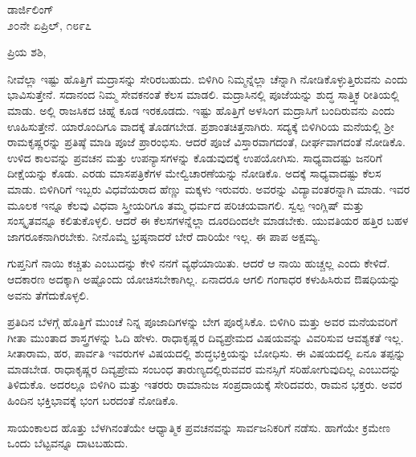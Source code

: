\vspace{-0.5cm}

\begin{flushright}
ಡಾರ್ಜಿಲಿಂಗ್\\೨೦ನೇ ಏಪ್ರಿಲ್, ೧೮೯೭
\end{flushright}

\vspace{-0.3cm}

\noindent
ಪ್ರಿಯ ಶಶಿ,

ನೀವೆಲ್ಲಾ ಇಷ್ಟು ಹೊತ್ತಿಗೆ ಮದ್ರಾಸನ್ನು ಸೇರಿರಬಹುದು. ಬಿಳಿಗಿರಿ ನಿಮ್ಮನ್ನೆಲ್ಲಾ ಚೆನ್ನಾಗಿ ನೋಡಿಕೊಳ್ಳುತ್ತಿರುವನು ಎಂದು ಭಾವಿಸುತ್ತೇನೆ. ಸದಾನಂದ ನಿಮ್ಮ ಸೇವಕನಂತೆ ಕೆಲಸ ಮಾಡಲಿ. ಮದ್ರಾಸಿನಲ್ಲಿ ಪೂಜೆಯನ್ನು ಶುದ್ಧ ಸಾತ್ತ್ವಿಕ ರೀತಿಯಲ್ಲಿ ಮಾಡು. ಅಲ್ಲಿ ರಾಜಸಿಕದ ಚಿಹ್ನೆ ಕೂಡ ಇರಕೂಡದು. ಇಷ್ಟು ಹೊತ್ತಿಗೆ ಅಳಸಿಂಗ ಮದ್ರಾಸಿಗೆ ಬಂದಿರುವನು ಎಂದು ಊಹಿಸುತ್ತೇನೆ. ಯಾರೊಂದಿಗೂ ವಾದಕ್ಕೆ ತೊಡಗಬೇಡ. ಪ್ರಶಾಂತಚಿತ್ತನಾಗಿರು. ಸದ್ಯಕ್ಕೆ ಬಿಳಿಗಿರಿಯ ಮನೆಯಲ್ಲಿ ಶ‍್ರೀ ರಾಮಕೃಷ್ಣರನ್ನು ಪ್ರತಿಷ್ಠೆ ಮಾಡಿ ಪೂಜೆ ಪ್ರಾರಂಭಿಸು. ಆದರೆ ಪೂಜೆ ವಿಸ್ತಾರವಾಗದಂತೆ, ದೀರ್ಘವಾಗದಂತೆ ನೋಡಿಕೊ. ಉಳಿದ ಕಾಲವನ್ನು ಪ್ರವಚನ ಮತ್ತು ಉಪನ್ಯಾಸಗಳನ್ನು ಕೊಡುವುದಕ್ಕೆ ಉಪಯೋಗಿಸು. ಸಾಧ್ಯವಾದಷ್ಟು ಜನರಿಗೆ ದೀಕ್ಷೆಯನ್ನು ಕೊಡು. ಎರಡು ಮಾಸಪತ್ರಿಕೆಗಳ ಮೇಲ್ವಿಚಾರಣೆಯನ್ನು ನೋಡಿಕೊ. ಅದಕ್ಕೆ ಸಾಧ್ಯವಾದಷ್ಟು ಕೆಲಸ ಮಾಡು. ಬಿಳಿಗಿರಿಗೆ ಇಬ್ಬರು ವಿಧವೆಯರಾದ ಹೆಣ್ಣು ಮಕ್ಕಳು ಇರುವರು. ಅವರನ್ನು ವಿದ್ಯಾವಂತರನ್ನಾಗಿ ಮಾಡು. ಇವರ ಮೂಲಕ ಇನ್ನೂ ಕೆಲವು ವಿಧವಾ ಸ್ತ್ರೀಯರಿಗೂ ತಮ್ಮ ಧರ್ಮದ ಪರಿಚಯವಾಗಲಿ. ಸ್ವಲ್ಪ ಇಂಗ್ಲಿಷ್ ಮತ್ತು ಸಂಸ್ಕೃತವನ್ನೂ ಕಲಿತುಕೊಳ್ಳಲಿ. ಆದರೆ ಈ ಕೆಲಸಗಳನ್ನೆಲ್ಲಾ ದೂರದಿಂದಲೇ ಮಾಡಬೇಕು. ಯುವತಿಯರ ಹತ್ತಿರ ಬಹಳ ಜಾಗರೂಕನಾಗಿರಬೇಕು. ನೀನೊಮ್ಮೆ ಭ್ರಷ್ಠನಾದರೆ ಬೇರೆ ದಾರಿಯೇ ಇಲ್ಲ. ಈ ಪಾಪ ಅಕ್ಷಮ್ಯ.

\vspace{0.1cm}

ಗುಪ್ತನಿಗೆ ನಾಯಿ ಕಚ್ಚಿತು ಎಂಬುದನ್ನು ಕೇಳಿ ನನಗೆ ವ್ಯಥೆಯಾಯಿತು. ಆದರೆ ಆ ನಾಯಿ ಹುಚ್ಚಲ್ಲ ಎಂದು ಕೇಳಿದೆ. ಆದಕಾರಣ ಅದಕ್ಕಾಗಿ ಅಷ್ಟೊಂದು ಯೋಚಿಸಬೇಕಾಗಿಲ್ಲ. ಏನಾದರೂ ಆಗಲಿ ಗಂಗಾಧರ ಕಳುಹಿಸಿರುವ ಔಷಧಿಯನ್ನು ಅವನು ತೆಗೆದುಕೊಳ್ಳಲಿ.

\vspace{0.1cm}

ಪ್ರತಿದಿನ ಬೆಳಗ್ಗೆ ಹೊತ್ತಿಗೆ ಮುಂಚೆ ನಿನ್ನ ಪೂಜಾದಿಗಳನ್ನು ಬೇಗ ಪೂರೈಸಿಕೊ. ಬಿಳಿಗಿರಿ ಮತ್ತು ಅವರ ಮನೆಯವರಿಗೆ ಗೀತಾ ಮುಂತಾದ ಶಾಸ್ತ್ರಗಳನ್ನು ಓದಿ ಹೇಳು. ರಾಧಾಕೃಷ್ಣರ ದಿವ್ಯಪ್ರೇಮದ ವಿಷಯವನ್ನು ವಿವರಿಸುವ ಆವಶ್ಯಕತೆ ಇಲ್ಲ. ಸೀತಾರಾಮ, ಹರ, ಪಾರ್ವತಿ ಇವರುಗಳ ವಿಷಯದಲ್ಲಿ ಶುದ್ಧಭಕ್ತಿಯನ್ನು ಬೋಧಿಸು. ಈ ವಿಷಯದಲ್ಲಿ ಏನೂ ತಪ್ಪನ್ನು ಮಾಡಬೇಡ. ರಾಧಾಕೃಷ್ಣರ ದಿವ್ಯಪ್ರೇಮ ಸಂಬಂಧ ತಾರುಣ್ಯದಲ್ಲಿರುವವರ ಮನಸ್ಸಿಗೆ ಸರಿಹೋಗುವುದಿಲ್ಲ ಎಂಬುದನ್ನು ತಿಳಿದುಕೊ. ಅದರಲ್ಲೂ ಬಿಳಿಗಿರಿ ಮತ್ತು ಇತರರು ರಾಮಾನುಜ ಸಂಪ್ರದಾಯಕ್ಕೆ ಸೇರಿದವರು, ರಾಮನ ಭಕ್ತರು. ಅವರ ಹಿಂದಿನ ಭಕ್ತಿಭಾವಕ್ಕೆ ಭಂಗ ಬರದಂತೆ ನೋಡಿಕೊ.

\vspace{0.1cm}

ಸಾಯಂಕಾಲದ ಹೊತ್ತು ಬೆಳಗಿನಂತೆಯೇ ಆಧ್ಯಾತ್ಮಿಕ ಪ್ರವಚನವನ್ನು ಸಾರ್ವಜನಿಕರಿಗೆ ನಡೆಸು. ಹಾಗೆಯೇ ಕ್ರಮೇಣ ಒಂದು ಬೆಟ್ಟವನ್ನೂ ದಾಟಬಹುದು.

